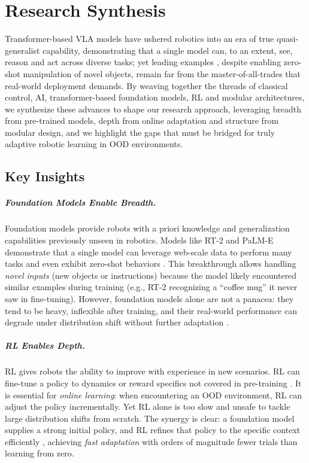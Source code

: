 \chapter{Research Synthesis}
\label{sec:synthesis}

Transformer-based \ac{VLA} models have ushered robotics into an era of true quasi-generalist capability, demonstrating that a single model can, to an extent, see, reason and act across diverse tasks; yet leading examples \cite{PI0.52025, HELIX2025, GR00T2025, GEMER2025}, despite enabling zero-shot manipulation of novel objects, remain far from the master-of-all-trades that real-world deployment demands. By weaving together the threads of classical control, \ac{AI}, transformer-based foundation models, \ac{RL} and modular architectures, we synthesize these advances to shape our research approach, leveraging breadth from pre-trained models, depth from online adaptation and structure from modular design, and we highlight the gaps that must be bridged for truly adaptive robotic learning in \ac{OOD} environments.

\section{Key Insights}

\paragraph{Foundation Models Enable Breadth.}
Foundation models provide robots with a priori knowledge and generalization capabilities previously unseen in robotics. Models like RT-2 and PaLM-E demonstrate that a single model can leverage web-scale data to perform many tasks and even exhibit zero-shot behaviors \cite{RT22023,PALM2023}. This breakthrough allows handling \emph{novel inputs} (new objects or instructions) because the model likely encountered similar examples during training (e.g., RT-2 recognizing a ``coffee mug'' it never saw in fine-tuning). However, foundation models alone are not a panacea: they tend to be heavy, inflexible after training, and their real-world performance can degrade under distribution shift without further adaptation \cite{COLOSSEUM2024}.

\paragraph{RL Enables Depth.}
\ac{RL} gives robots the ability to improve with experience in new scenarios. \ac{RL} can fine-tune a policy to dynamics or reward specifics not covered in pre-training \cite{RLSURVEY2013}. It is essential for \emph{online learning}: when encountering an \ac{OOD} environment, \ac{RL} can adjust the policy incrementally. Yet \ac{RL} alone is too slow and unsafe to tackle large distribution shifts from scratch. The synergy is clear: a foundation model supplies a strong initial policy, and \ac{RL} refines that policy to the specific context efficiently \cite{PPO2017}, achieving \emph{fast adaptation} with orders of magnitude fewer trials than learning from zero.

